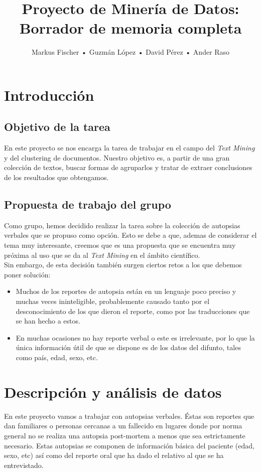 \documentclass[10pt,a4paper]{article}
\author{Markus Fischer • Guzmán López • David Pérez • Ander Raso}
\title{Proyecto de Minería de Datos: \linebreak Borrador de memoria completa}
\date{}
\begin{document}
\maketitle
\newpage

\tableofcontents
\newpage

\section{Introducción}
	\subsection{Objetivo de la tarea}
	En este proyecto se nos encarga la tarea de trabajar en el campo del \textit{Text Mining} y del clustering de documentos. Nuestro objetivo es, a partir de una gran colección de textos, buscar formas de agruparlos y tratar de extraer conclusiones de los resultados que obtengamos.
	\subsection{Propuesta de trabajo del grupo}
	Como grupo, hemos decidido realizar la tarea sobre la colección de autopsias verbales que se propuso como opción. Esto se debe a que, ademas de considerar el tema muy interesante, creemos que es una propuesta que se encuentra muy próxima al uso que se da al \textit{Text Mining} en el ámbito científico.\\
	
    Sin embargo, de esta decisión también surgen ciertos retos a los que debemos poner solución:
	\begin{itemize}
	\item Muchos de los reportes de autopsia están en un lenguaje poco preciso y muchas veces ininteligible, probablemente causado tanto por el desconocimiento de los que dieron el reporte, como por las traducciones que se han hecho a estos.
	\item En muchas ocasiones no hay reporte verbal o este es irrelevante, por lo que la única información útil de que se dispone es de los datos del difunto, tales como país, edad, sexo, etc.
	\end{itemize}

\section{Descripción y análisis de datos}
En este proyecto vamos a trabajar con autopsias verbales. Éstas son reportes que dan familiares o personas cercanas a un fallecido en lugares donde por norma general no se realiza una autopsia post-mortem a menos que sea estrictamente necesario. Estas autopsias se componen de información básica del paciente (edad, sexo, etc) así como del reporte oral que ha dado el relativo al que se ha entrevistado.\\
\end{document}

